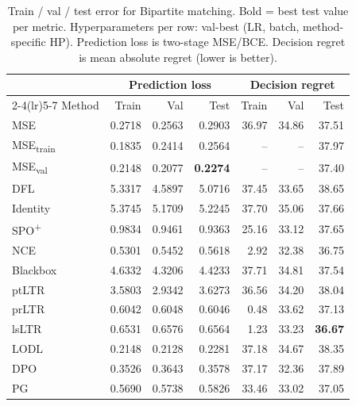 \begin{table}[t]
\centering
\caption{Train / val / test error for Bipartite matching. Bold = best test value per metric. Hyperparameters per row: val-best (LR, batch, method-specific HP). Prediction loss is two-stage MSE/BCE. Decision regret is mean absolute regret (lower is better).}
\label{tab:err-bipartitematching}
\setlength{\tabcolsep}{4pt}
\renewcommand{\arraystretch}{1.05}
\begin{tabular}{@{}lrrrrrr@{}}
\toprule
& \multicolumn{3}{c}{Prediction loss} & \multicolumn{3}{c}{Decision regret} \\
\cmidrule(lr){2-4}\cmidrule(lr){5-7}
Method & Train & Val & Test & Train & Val & Test \\
\midrule
MSE & 0.2718 & 0.2563 & 0.2903 & 36.97 & 34.86 & 37.51 \\
MSE\textsubscript{train} & 0.1835 & 0.2414 & 0.2564 & -- & -- & 37.97 \\
MSE\textsubscript{val} & 0.2148 & 0.2077 & \textbf{0.2274} & -- & -- & 37.40 \\
DFL & 5.3317 & 4.5897 & 5.0716 & 37.45 & 33.65 & 38.65 \\
Identity & 5.3745 & 5.1709 & 5.2245 & 37.70 & 35.06 & 37.66 \\
SPO\textsuperscript{+} & 0.9834 & 0.9461 & 0.9363 & 25.16 & 33.12 & 37.65 \\
NCE & 0.5301 & 0.5452 & 0.5618 & 2.92 & 32.38 & 36.75 \\
Blackbox & 4.6332 & 4.3206 & 4.4233 & 37.71 & 34.81 & 37.54 \\
ptLTR & 3.5803 & 2.9342 & 3.6273 & 36.56 & 34.20 & 38.04 \\
prLTR & 0.6042 & 0.6048 & 0.6046 & 0.48 & 33.62 & 37.13 \\
lsLTR & 0.6531 & 0.6576 & 0.6564 & 1.23 & 33.23 & \textbf{36.67} \\
LODL & 0.2148 & 0.2128 & 0.2281 & 37.18 & 34.67 & 38.35 \\
DPO & 0.3526 & 0.3643 & 0.3578 & 37.17 & 32.36 & 37.89 \\
PG & 0.5690 & 0.5738 & 0.5826 & 33.46 & 33.02 & 37.05 \\
\bottomrule
\end{tabular}
\end{table}

